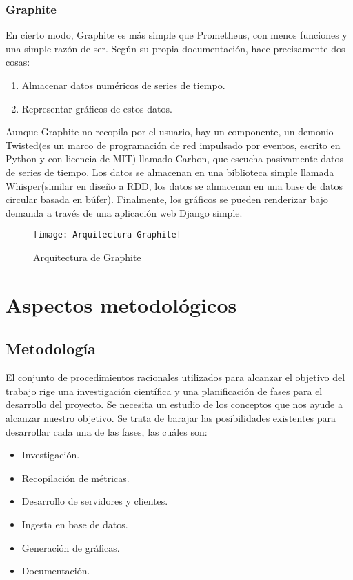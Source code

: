 \documentclass[ spanish, a4paper, 12pt, oneside]{report}
\begin{document}
\subsection{Graphite}

En cierto modo, Graphite es más simple que Prometheus, con menos funciones y una simple razón de ser. Según su propia documentación, hace precisamente dos cosas: \\

\begin{enumerate}
   \item Almacenar datos numéricos de series de tiempo.
   \item Representar gráficos de estos datos.
\end{enumerate}


Aunque Graphite no recopila por el usuario, hay un componente, un demonio Twisted(es un marco de programación de red impulsado por eventos, escrito en Python y con licencia de MIT) llamado Carbon, que escucha pasivamente datos de series 
de tiempo. Los datos se almacenan en una biblioteca simple llamada Whisper(similar en diseño a RDD, los datos se almacenan en una base de datos circular basada en búfer). Finalmente, los gráficos se pueden renderizar bajo demanda a través de una 
aplicación web Django simple. \\

\begin{figure}[!h]
   \centering
   \texttt{[image: Arquitectura-Graphite]}\\
      \caption{\label{fig: Arquitectura de Graphite} Arquitectura de Graphite}
\end{figure}

\chapter{Aspectos metodológicos}

\section{Metodología}
El conjunto de procedimientos racionales utilizados para alcanzar el objetivo del trabajo rige una investigación científica y una planificación de fases para el 
desarrollo del proyecto. Se necesita un estudio de los conceptos que nos ayude a alcanzar nuestro objetivo. Se trata de barajar las posibilidades existentes para desarrollar cada 
una de las fases, las cuáles son:

\begin{itemize}
   \item Investigación.
   \item Recopilación de métricas.
   \item Desarrollo de servidores y clientes.
   \item Ingesta en base de datos.
   \item Generación de gráficas.
   \item Documentación.
\end{itemize}
\end{document}
